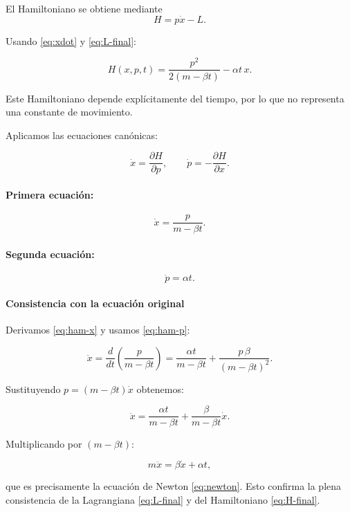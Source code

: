\documentclass{article}
\begin{document}
El Hamiltoniano se obtiene mediante
\[
H = p\dot x - L.
\]

Usando \eqref{eq:xdot} y \eqref{eq:L-final}:

\begin{equation}
H(x,p,t)
=
\frac{p^{2}}{2(m-\beta t)}
- \alpha t\,x.
\label{eq:H-final}
\end{equation}

Este Hamiltoniano depende explícitamente del tiempo, por lo que no representa una
constante de movimiento.


Aplicamos las ecuaciones canónicas:

\[
\dot x = \frac{\partial H}{\partial p},
\qquad
\dot p = -\frac{\partial H}{\partial x}.
\]

\paragraph{Primera ecuación:}
\begin{equation}
\dot x
= \frac{p}{m-\beta t}.
\label{eq:ham-x}
\end{equation}

\paragraph{Segunda ecuación:}
\begin{equation}
\dot p
= \alpha t.
\label{eq:ham-p}
\end{equation}

\paragraph{Consistencia con la ecuación original}

Derivamos \eqref{eq:ham-x} y usamos \eqref{eq:ham-p}:

\[
\ddot x
= \frac{d}{dt}
\left(
\frac{p}{m-\beta t}
\right)
=
\frac{\alpha t}{m-\beta t}
+ \frac{p\,\beta}{(m-\beta t)^{2}}.
\]

Sustituyendo $p=(m-\beta t)\dot x$ obtenemos:

\[
\ddot x
=
\frac{\alpha t}{m-\beta t}
+ \frac{\beta}{m-\beta t}\dot x.
\]

Multiplicando por $(m-\beta t)$:

\[
m\ddot x
= \beta\dot x + \alpha t,
\]

que es precisamente la ecuación de Newton \eqref{eq:newton}.  
Esto confirma la plena consistencia de la Lagrangiana \eqref{eq:L-final} y del Hamiltoniano \eqref{eq:H-final}.
\end{document}
